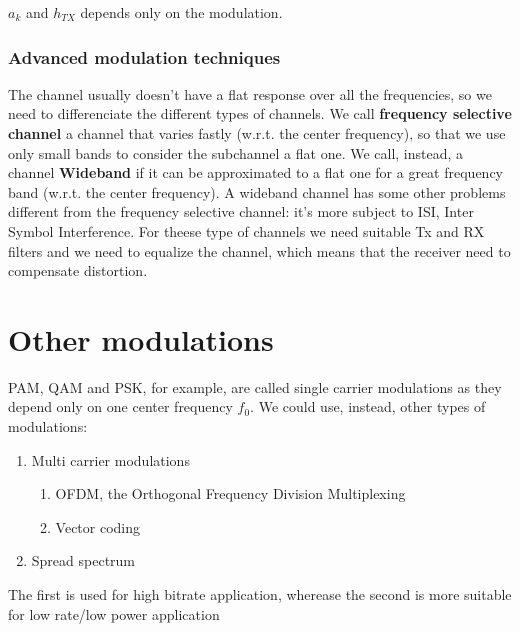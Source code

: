 %   

$a_k$ and $h_{TX}$ depends only on the modulation.

%   
\subsubsection{Advanced modulation techniques}
The channel usually doesn't have a flat response over all the frequencies, so we need to differenciate the different types of channels. We call \textbf{ frequency selective channel} a channel that varies fastly (w.r.t. the center frequency), so that we use only small bands to consider the subchannel a flat one. We call, instead, a channel \textbf{Wideband} if it can be approximated
to a flat one for a great frequency band (w.r.t. the center frequency). A wideband channel has some other problems different from the frequency selective channel: it's more subject to ISI, Inter Symbol Interference. For theese type of channels we need suitable Tx and RX filters and we need to equalize the channel, which means that the receiver need to compensate distortion.

\section{Other modulations}
PAM, QAM and PSK, for example, are called single carrier modulations as they depend only on one center frequency $f_0$. We could use, instead, other types of modulations:
\begin{enumerate}
  \item Multi carrier modulations

\begin{enumerate}
  \item OFDM, the Orthogonal Frequency Division Multiplexing
  \item Vector coding
\end{enumerate}
\item Spread spectrum
\end{enumerate}

The first is used for high bitrate application, wherease the second is more suitable for low rate/low power application

